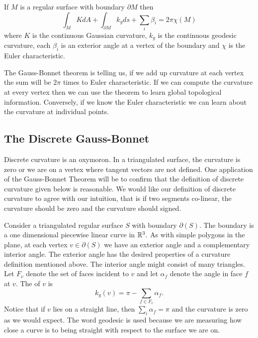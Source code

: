 \begin{theorem} \label{thm:g-b-c}

If $M$ is a regular surface with boundary $\partial M$ then
	$$\int_{M} K dA+ \int_{\partial M} k_g ds + \sum_i \beta_i= 2\pi \chi(M)$$
	where  $K$ is the continuous Gaussian curvature,
	 $k_g$ is the continuous geodesic curvature,
	 each $\beta_i$  is an exterior angle at a vertex of the boundary and
	$\chi$ is the Euler characteristic.
\end{theorem}


The  Gauss-Bonnet theorem is  telling us, if we add up curvature
at each vertex the sum will be $2\pi$ times to Euler characteristic.
If we can compute the curvature at every vertex then we can use the theorem
to learn global topological information.
Conversely, if we know the Euler characteristic we can learn about the curvature
at individual points.

\subsection{The Discrete Gauss-Bonnet}

Discrete curvature is an oxymoron. In a triangulated surface,
the curvature is zero or we are on a vertex where tangent vectors are not defined.
One application of the Gauss-Bonnet Theorem will be to confirm that the definition of discrete curvature 
given below is reasonable.
We would like our definition of discrete curvature to agree with
our intuition, that is if two segments co-linear, the curvature should be zero
and the curvature should signed.

Consider a triangulated regular surface $S$ with boundary $\partial(S)$.
The boundary is a one dimensional piecewise linear curve in $\mathbb{R}^3.$
As with simple polygons in the plane, at each vertex $v\in \partial(S)$ 
we have an exterior angle and a complementary interior angle.
The exterior angle has the desired properties of a curvature definition mentioned above.
The interior angle might consist of many triangles.
Let $F_v$  denote the set of faces incident to $v$ and let
$\alpha_f$ denote the angle in face $f$ at $v$.
The 
of $v$  is
$$k_{g}(v)= \pi-\sum_{f\in F_v}\alpha_f.$$
Notice that if $v$ lies on a straight line, then $\sum_{i}\alpha_f=\pi$
and the curvature is zero as we would expect.
The word geodesic is used because we are measuring how close
a curve is to being straight with respect to the surface we are on.


